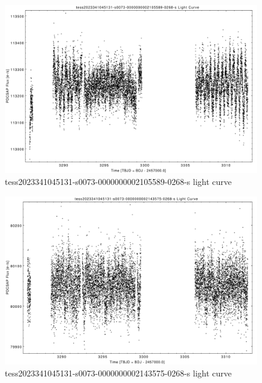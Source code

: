 \documentclass[a4paper,12pt]{article}
\begin{document}
\begin{figure}[htbp]
    \centering
    \includegraphics[width = 1\textwidth]{
      lightcurves/tess2023341045131-s0073-0000000002105589-0268-s.pdf}
    \caption{tess2023341045131-s0073-0000000002105589-0268-s light curve}
\end{figure}
\begin{figure}[htbp]
    \centering
    \includegraphics[width = 1\textwidth]{
      lightcurves/tess2023341045131-s0073-0000000002143575-0268-s.pdf}
    \caption{tess2023341045131-s0073-0000000002143575-0268-s light curve}
\end{figure}
\end{document}
